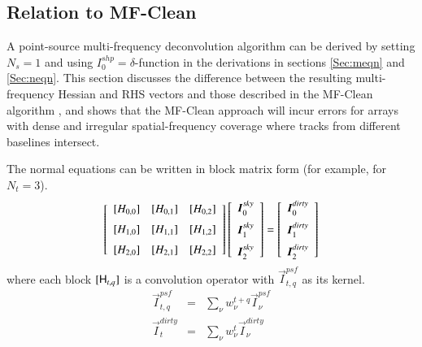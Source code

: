 \documentclass[structabstract]{stylefiles/aa}
\newcommand{\Fd}{{\tens{F^\dag}}}
\newcommand{\He}{{\tens{H}}}
\newcommand{\Snd}{\tens{{S_{\nu}^\dag}}}
\newcommand{\Wimn}{{\tens{W^{im}_{\nu}}}}
\newcommand{\wnt}{{w_{\nu}^t}}
\newcommand{\wntq}{{w_{\nu}^{t+q}}}
\begin{document}
\subsection{Relation to MF-Clean}
A point-source multi-frequency deconvolution algorithm can be derived by setting  $N_s=1$ and
using $I^{shp}_0 = \delta$-function in the derivations in sections \ref{Sec:meqn} and \ref{Sec:neqn}.
This section discusses the difference between the resulting multi-frequency Hessian and RHS vectors
and those described in the MF-Clean algorithm \citep{MFCLEAN}, and shows that the MF-Clean
approach will incur errors for arrays with dense and irregular spatial-frequency coverage where
tracks from different baselines intersect.

\noindent The normal equations can be written in block matrix form (for example, for $N_t=3$).
\begin{equation}
\left[\begin{array}{lll} 
   [H_{0,0}] & [H_{0,1}] & [H_{0,2}]\\  
\noalign{\medskip}
   [H_{1,0}] & [H_{1,1}] & [H_{1,2}] \\  
\noalign{\medskip}
   [H_{2,0}] & [H_{2,1}] & [H_{2,2}] \\  
   \end{array} \right]
\left[\begin{array}{l} \vec{I}^{sky}_{0} \\ 
\noalign{\medskip}
                       \vec{I}^{sky}_{1} \\ 
\noalign{\medskip}
		       \vec{I}^{sky}_{2}\end{array}\right] =
\left[\begin{array}{l} \vec{I}^{dirty}_{0}\\
\noalign{\medskip}
		       \vec{I}^{dirty}_{1} \\
\noalign{\medskip}
		       \vec{I}^{dirty}_{2}\end{array}\right] 
\label{Eq:mfs_neqn3}
\end{equation}
where each block $[\He_{t,q}]$ is a convolution operator with $\vec{I}^{psf}_{t,q}$ as its kernel.
\begin{eqnarray}
\label{Eq:mf_neqn_2b}
\vec{I}^{psf}_{t,q}  &=& \sum_{\nu} \wntq \vec{I}^{psf}_{\nu}\\
\label{Eq:mf_neqn_3a}
\vec{I}^{dirty}_{t}  &=& \sum_{\nu} \wnt \vec{I}^{dirty}_{\nu}
\end{eqnarray}
\end{document}
